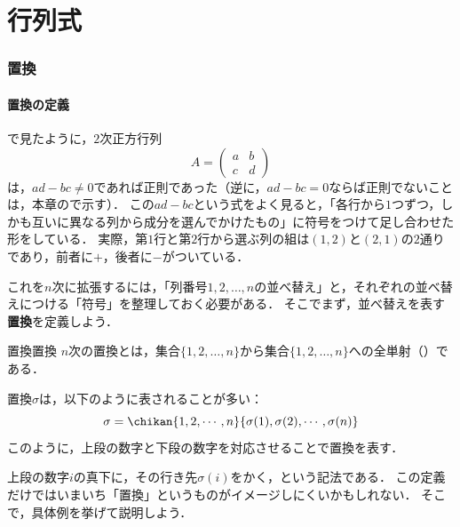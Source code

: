 \part{行列式}

\begin{abstract}
  $2$次正方行列の正則性を判定する$ad - bc$を一般化した\textbf{行列式}を，置換を用いて定義する．
  その基本性質と余因子展開を調べ，逆行列の公式とクラメールの公式を導く．
\end{abstract}

\section{置換}

\subsection{置換の定義}

で見たように，$2$次正方行列
\[
  A = \begin{pmatrix} a & b \\ c & d \end{pmatrix}
\]
は，$ad - bc \ne 0$であれば正則であった（逆に，$ad - bc = 0$ならば正則でないことは，本章ので示す）．
この$ad - bc$という式をよく見ると，「各行から$1$つずつ，しかも互いに異なる列から成分を選んでかけたもの」に符号をつけて足し合わせた形をしている．
実際，第$1$行と第$2$行から選ぶ列の組は$(1, 2)$と$(2, 1)$の$2$通りであり，前者に$+$，後者に$-$がついている．

これを$n$次に拡張するには，「列番号$1, 2, \dots, n$の並べ替え」と，それぞれの並べ替えにつける「符号」を整理しておく必要がある．
そこでまず，並べ替えを表す\textbf{置換}を定義しよう．

\begin{definition}{置換}{置換}
  $n$次の置換とは，集合$\{1, 2, \dots, n\}$から集合$\{1, 2, \dots, n\}$への全単射（）である．
  
  置換$\sigma$は，以下のように表されることが多い：
  \[
  \sigma = \chikan{1, 2, \cdots, n}{\sigma(1), \sigma(2), \cdots, \sigma(n)}
  \]
  このように，上段の数字と下段の数字を対応させることで置換を表す．
\end{definition}

上段の数字$i$の真下に，その行き先$\sigma(i)$をかく，という記法である．
この定義だけではいまいち「置換」というものがイメージしにくいかもしれない．
そこで，具体例を挙げて説明しよう．

